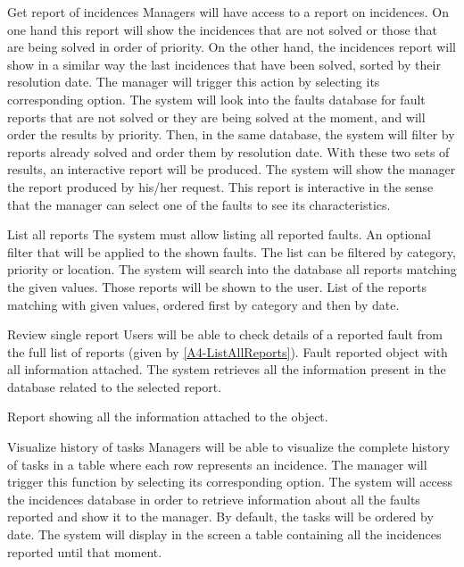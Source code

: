 \begin{requirement}{Get report of incidences}
\reqdesc Managers will have access to a report on incidences. On one hand this report will show the incidences that are not solved or those that are being solved in order of priority. On the other hand, the incidences report will show in a similar way the last incidences that have been solved, sorted by
their resolution date.
\reqin The manager will trigger this action by selecting its corresponding option.
\reqsteps The system will look into the faults database for fault reports that are not solved or they are being solved at the moment, and will order the results by priority. Then, in the same database, the system will filter by reports already solved and order them by resolution date. With these two sets of results, an interactive report will be produced.
\reqout The system will show the manager the report produced by his/her request. This report is interactive in the sense that the manager can select one of the faults to see its characteristics.
\end{requirement}

\begin{requirement}{List all reports}\label{A4-ListAllReports}
\reqdesc The system must allow listing all reported faults.
\reqin An optional filter that will be applied to the shown faults. The list can be filtered by category, priority or location.
\reqsteps The system will search into the database all reports matching the given values. Those reports will be shown to the user.
\reqout List of the reports matching with given values, ordered first by category and then by date.
\end{requirement}

\begin{requirement}{Review single report}
\reqdesc Users will be able to check details of a reported fault from the full list of reports (given by \ref{A4-ListAllReports}).
\reqin Fault reported object with all information attached.
\reqsteps The system retrieves all the information present in the database related to the selected report.

\reqout Report showing all the information attached to the object.
\end{requirement}


\begin{requirement}{Visualize history of tasks}
\reqdesc Managers will be able to visualize the complete
history of tasks in a table where each row represents an incidence.
\reqin The manager will trigger this function by selecting its corresponding option.
\reqsteps The system will access the incidences database in order to retrieve information about all the faults reported and show it to the manager. By default, the tasks will be ordered by date.
\reqout The system will display in the screen a table containing all the incidences reported until that moment.
\end{requirement}

